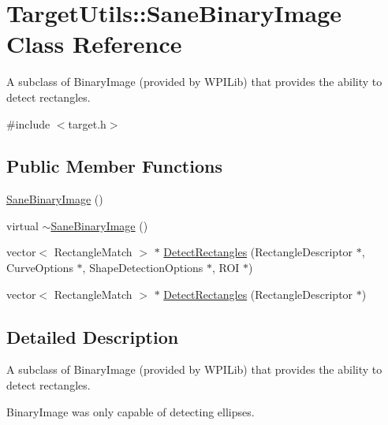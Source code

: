 \hypertarget{class_target_utils_1_1_sane_binary_image}{\section{\-Target\-Utils\-:\-:\-Sane\-Binary\-Image \-Class \-Reference}
\label{class_target_utils_1_1_sane_binary_image}
}


\-A subclass of \-Binary\-Image (provided by \-W\-P\-I\-Lib) that provides the ability to detect rectangles.  




{\ttfamily \#include $<$target.\-h$>$}

\subsection*{\-Public \-Member \-Functions}
\begin{DoxyCompactItemize}
\item 
\hyperlink{class_target_utils_1_1_sane_binary_image_a0221348237d2d856e754adff0bd71274}{\-Sane\-Binary\-Image} ()
\item 
virtual \hyperlink{class_target_utils_1_1_sane_binary_image_a8628b72d9c835914eb5f4a59e58fc525}{$\sim$\-Sane\-Binary\-Image} ()
\item 
vector$<$ \-Rectangle\-Match $>$ $\ast$ \hyperlink{class_target_utils_1_1_sane_binary_image_a33a07eca59fad40fe8fb2de103c80bbd}{\-Detect\-Rectangles} (\-Rectangle\-Descriptor $\ast$, \-Curve\-Options $\ast$, \-Shape\-Detection\-Options $\ast$, \-R\-O\-I $\ast$)
\item 
vector$<$ \-Rectangle\-Match $>$ $\ast$ \hyperlink{class_target_utils_1_1_sane_binary_image_a008660a01dab5bd73c4f6fde3d584c82}{\-Detect\-Rectangles} (\-Rectangle\-Descriptor $\ast$)
\end{DoxyCompactItemize}


\subsection{\-Detailed \-Description}
\-A subclass of \-Binary\-Image (provided by \-W\-P\-I\-Lib) that provides the ability to detect rectangles. 

\-Binary\-Image was only capable of detecting ellipses. 

